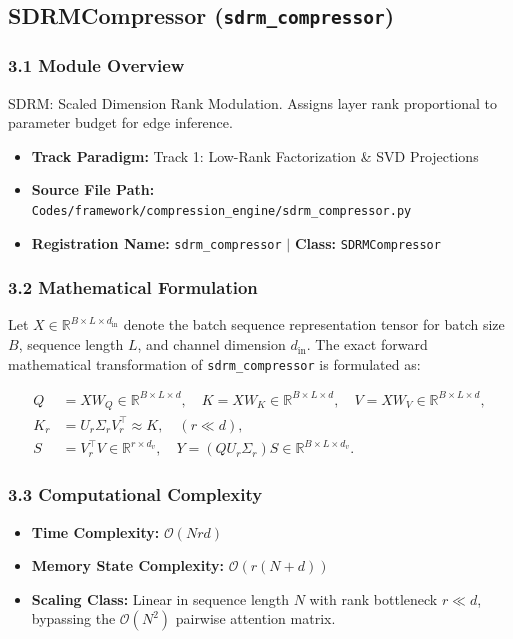 \subsection{SDRMCompressor (\texttt{sdrm\_compressor})}
\label{sec:app_module_sdrm\_compressor}

\subsubsection*{3.1 Module Overview}
SDRM: Scaled Dimension Rank Modulation. Assigns layer rank proportional to parameter budget for edge inference.
\begin{itemize}
    \item \textbf{Track Paradigm:} Track 1: Low-Rank Factorization & SVD Projections
    \item \textbf{Source File Path:} \texttt{Codes/framework/compression\_engine/sdrm\_compressor.py}
    \item \textbf{Registration Name:} \texttt{sdrm\_compressor} $\mid$ \textbf{Class:} \texttt{SDRMCompressor}
\end{itemize}

\subsubsection*{3.2 Mathematical Formulation}
Let $X \in \mathbb{R}^{B \times L \times d_{\text{in}}}$ denote the batch sequence representation tensor for batch size $B$, sequence length $L$, and channel dimension $d_{\text{in}}$. The exact forward mathematical transformation of \texttt{sdrm\_compressor} is formulated as:

\begin{align}
Q &= X W_Q \in \mathbb{R}^{B \times L \times d}, \quad K = X W_K \in \mathbb{R}^{B \times L \times d}, \quad V = X W_V \in \mathbb{R}^{B \times L \times d}, \\
K_r &= U_r \Sigma_r V_r^\top \approx K, \quad (r \ll d), \\
S &= V_r^\top V \in \mathbb{R}^{r \times d_v}, \quad Y = (Q U_r \Sigma_r) S \in \mathbb{R}^{B \times L \times d_v}.
\end{align}


\subsubsection*{3.3 Computational Complexity}
\begin{itemize}
    \item \textbf{Time Complexity:} $\mathcal{O}(N r d)$
    \item \textbf{Memory State Complexity:} $\mathcal{O}(r(N + d))$
    \item \textbf{Scaling Class:} Linear in sequence length $N$ with rank bottleneck $r \ll d$, bypassing the $\mathcal{O}(N^2)$ pairwise attention matrix.
\end{itemize}

